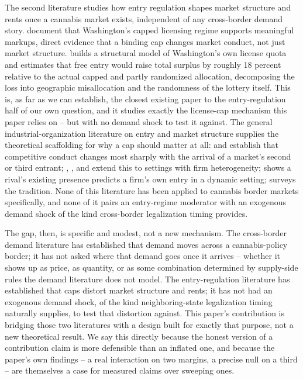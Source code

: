 \documentclass[12pt]{article}
\begin{document}
The second literature studies how entry regulation shapes market structure and rents once a cannabis market
exists, independent of any cross-border demand story. \citet{HollenbeckUetake2021} document that Washington's
capped licensing regime supports meaningful markups, direct evidence that a binding cap changes market conduct,
not just market structure. \citet{Thomas2019LicenseQuotas} builds a structural model of Washington's own license
quota and estimates that free entry would raise total surplus by roughly 18 percent relative to the actual
capped and partly randomized allocation, decomposing the loss into geographic misallocation and the randomness
of the lottery itself. This is, as far as we can establish, the closest existing paper to the entry-regulation
half of our own question, and it studies exactly the license-cap mechanism this paper relies on -- but with no
demand shock to test it against. The general industrial-organization literature on entry and market structure
supplies the theoretical scaffolding for why a cap should matter at all: \citet{BresnahanReiss1990} and
\citet{BresnahanReiss1991} establish that competitive conduct changes most sharply with the arrival of a
market's second or third entrant; \citet{Berry1992}, \citet{Mazzeo2002}, and \citet{Seim2006} extend this to
settings with firm heterogeneity; \citet{ToivanenWaterson2005} shows a rival's existing presence predicts a
firm's own entry in a dynamic setting; \citet{BerryReiss2007} surveys the tradition. None of this literature
has been applied to cannabis border markets specifically, and none of it pairs an entry-regime moderator with an
exogenous demand shock of the kind cross-border legalization timing provides.

The gap, then, is specific and modest, not a new mechanism. The cross-border demand literature has established
that demand moves across a cannabis-policy border; it has not asked where that demand goes once it arrives --
whether it shows up as price, as quantity, or as some combination determined by supply-side rules the demand
literature does not model. The entry-regulation literature has established that caps distort market structure
and rents; it has not had an exogenous demand shock, of the kind neighboring-state legalization timing
naturally supplies, to test that distortion against. This paper's contribution is bridging those two
literatures with a design built for exactly that purpose, not a new theoretical result. We say this directly
because the honest version of a contribution claim is more defensible than an inflated one, and because the
paper's own findings -- a real interaction on two margins, a precise null on a third -- are themselves a case
for measured claims over sweeping ones.
\end{document}
